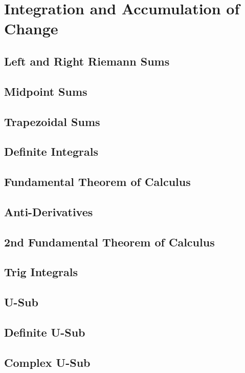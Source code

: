 \documentclass[../abcalc.tex]{subfiles}
\begin{document}
\chapter{Integration and Accumulation of Change}
\section{Left and Right Riemann Sums}
\section{Midpoint Sums}
\section{Trapezoidal Sums}
\section{Definite Integrals}
\section{Fundamental Theorem of Calculus}
\section{Anti-Derivatives}
\section{2nd Fundamental Theorem of Calculus}
\section{Trig Integrals}
\section{U-Sub}
\section{Definite U-Sub}
\section{Complex U-Sub}
\end{document}
